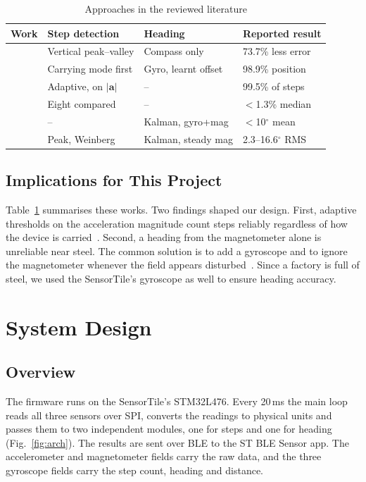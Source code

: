 \documentclass[conference,a4paper]{IEEEtran}
\begin{document}
\begin{table}[!h]
\centering
\footnotesize
\setlength{\tabcolsep}{3pt}
\caption{Approaches in the reviewed literature}
\label{tab:lit}
\begin{tabular}{@{}llll@{}}
\toprule
Work & Step detection & Heading & Reported result \\
\midrule
\cite{jin2011} & Vertical peak--valley & Compass only & 73.7\% less error \\
\cite{tian2016} & Carrying mode first & Gyro, learnt offset & 98.9\% position \\
\cite{lee2015} & Adaptive, on $|\mathbf{a}|$ & -- & 99.5\% of steps \\
\cite{brajdic2013} & Eight compared & -- & $<$1.3\% median \\
\cite{yuan2015} & -- & Kalman, gyro+mag & $<$10$^\circ$ mean \\
\cite{kuang2018} & Peak, Weinberg & Kalman, steady mag & 2.3--16.6$^\circ$ RMS \\
\bottomrule
\end{tabular}
\end{table}

\subsection{Implications for This Project}
Table~\ref{tab:lit} summarises these works. Two findings shaped our design. First, adaptive thresholds on the acceleration magnitude count steps reliably regardless of
how the device is carried~\cite{lee2015,brajdic2013}. Second, a heading from the magnetometer
alone is unreliable near steel. The common solution is to add a gyroscope and to ignore the
magnetometer whenever the field appears disturbed~\cite{yuan2015,kuang2018}. Since a factory is full of steel, we used the SensorTile's
gyroscope as well to ensure heading accuracy.

\section{System Design}
\subsection{Overview}
The firmware runs on the SensorTile's STM32L476. Every 20\,ms the main loop reads all three
sensors over SPI, converts the readings to physical units and passes them to two independent
modules, one for steps and one for heading (Fig.~\ref{fig:arch}). The results are sent over
BLE to the ST BLE Sensor app. The accelerometer and magnetometer fields carry the raw data,
and the three gyroscope fields carry the step count, heading and distance.
\end{document}

